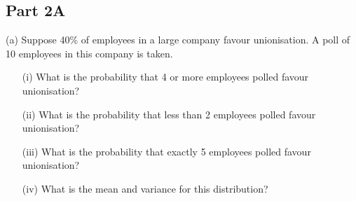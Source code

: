 \subsection*{Part 2A}

(a)	Suppose 40\% of employees in a large company favour unionisation.  A poll of 10 employees in this company is taken.  
 \begin{itemize}
\item[(i)]  	What is the probability that 4 or more employees polled favour unionisation? 
\item[(ii)]  	What is the probability that less than 2 employees polled favour unionisation?
\item[(iii)]  	What is the probability that exactly 5 employees polled favour unionisation?
\item[(iv)]  	What is the mean and variance for this distribution?
\end{itemize}										       
